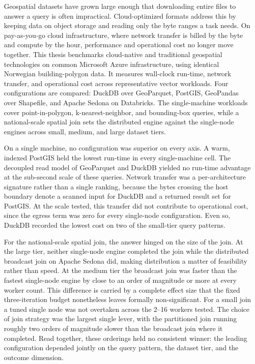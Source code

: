 Geospatial datasets have grown large enough that downloading entire files to answer a query is often impractical. Cloud-optimized formats address this by keeping data on object storage and reading only the byte ranges a task needs. On pay-as-you-go cloud infrastructure, where network transfer is billed by the byte and compute by the hour, performance and operational cost no longer move together. This thesis benchmarks cloud-native and traditional geospatial technologies on common Microsoft Azure infrastructure, using identical Norwegian building-polygon data. It measures wall-clock run-time, network transfer, and operational cost across representative vector workloads. Four configurations are compared: DuckDB over GeoParquet, PostGIS, GeoPandas over Shapefile, and Apache Sedona on Databricks. The single-machine workloads cover point-in-polygon, k-nearest-neighbor, and bounding-box queries, while a national-scale spatial join sets the distributed engine against the single-node engines across small, medium, and large dataset tiers.

On a single machine, no configuration was superior on every axis. A warm, indexed PostGIS held the lowest run-time in every single-machine cell. The decoupled read model of GeoParquet and DuckDB yielded no run-time advantage at the sub-second scale of these queries. Network transfer was a per-architecture signature rather than a single ranking, because the bytes crossing the host boundary denote a scanned input for DuckDB and a returned result set for PostGIS. At the scale tested, this transfer did not contribute to operational cost, since the egress term was zero for every single-node configuration. Even so, DuckDB recorded the lowest cost on two of the small-tier query patterns.

For the national-scale spatial join, the answer hinged on the size of the join. At the large tier, neither single-node engine completed the join while the distributed broadcast join on Apache Sedona did, making distribution a matter of feasibility rather than speed. At the medium tier the broadcast join was faster than the fastest single-node engine by close to an order of magnitude or more at every worker count. This difference is carried by a complete effect size that the fixed three-iteration budget nonetheless leaves formally non-significant. For a small join a tuned single node was not overtaken across the 2--16 workers tested. The choice of join strategy was the largest single lever, with the partitioned join running roughly two orders of magnitude slower than the broadcast join where it completed. Read together, these orderings held no consistent winner: the leading configuration depended jointly on the query pattern, the dataset tier, and the outcome dimension.


